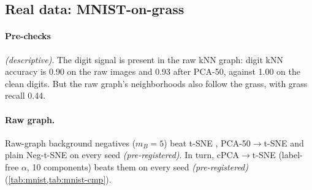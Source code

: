 \documentclass[10pt]{article}
\newcommand{\cpre}{\textit{\small (pre-registered)}}
\newcommand{\cdesc}{\textit{\small (descriptive)}}
\begin{document}
\begin{table}[htbp]
\centering
\small
\caption{Additive synthetic benchmarks: signal kNN accuracy on the confirmation seeds, mean [min, max]. Background negatives use the raw kNN graph at the $m_B$ chosen on the selection seeds (10, 20 and 10). Every difference between background negatives and a control is consistent across 3 paired seeds \cpre. The last two columns are descriptive here: cPCA-2D is the 2-D cPCA projection used directly as the embedding, and cPCA$\to$Neg-t-SNE embeds the top cPCA directions; both use the label-free $\alpha$.}
\label{tab:additive}

\end{table}

\subsection{Real data: MNIST-on-grass}
\label{sec:mnist}

\paragraph{Pre-checks} \cdesc. The digit signal is present in the raw kNN graph: digit kNN accuracy is 0.90 on the raw images and 0.93 after PCA-50, against 1.00 on the clean digits. But the raw graph's neighborhoods also follow the grass, with grass recall 0.44.

\paragraph{Raw graph.} Raw-graph background negatives ($m_B = 5$) beat t-SNE \cite{policar2024opentsne}, PCA-50$\to$t-SNE and plain Neg-t-SNE on every seed \cpre. In turn, cPCA$\to$t-SNE (label-free $\alpha$, 10 components) beats them on every seed \cpre{} (\cref{tab:mnist,tab:mnist-cmp}).
\end{document}
